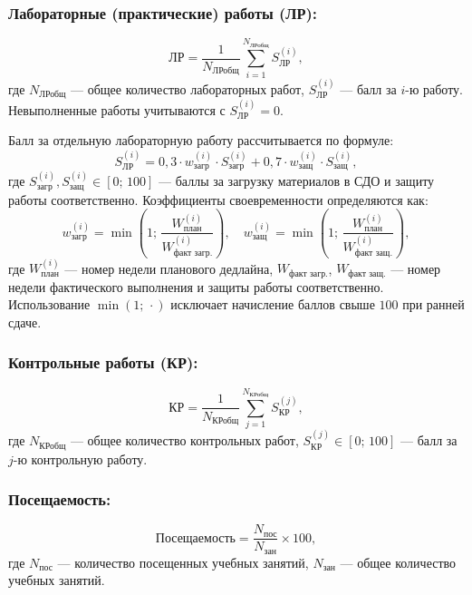 \documentclass[10pt,a4paper]{article}
\begin{document}
    \subsubsection{Лабораторные (практические) работы (ЛР):}
    \begin{equation}
        \text{ЛР} = \frac{1}{N_{\text{ЛРобщ}}} \sum_{i=1}^{N_{\text{ЛРобщ}}} S_{\text{ЛР}}^{(i)},
    \end{equation}
    где $N_{\text{ЛРобщ}}$ --- общее количество лабораторных работ, $S_{\text{ЛР}}^{(i)}$ --- балл за $i$-ю работу.
    Невыполненные работы учитываются с $S_{\text{ЛР}}^{(i)} = 0$.

    Балл за отдельную лабораторную работу рассчитывается по формуле:
    \begin{equation}
        S_{\text{ЛР}}^{(i)} = 0,3 \cdot w_{\text{загр}}^{(i)} \cdot S_{\text{загр}}^{(i)} + 0,7 \cdot w_{\text{защ}}^{(i)} \cdot S_{\text{защ}}^{(i)},
    \end{equation}
    где $S_{\text{загр}}^{(i)}, S_{\text{защ}}^{(i)} \in [0;\,100]$ --- баллы за загрузку материалов в СДО и защиту работы соответственно.
    Коэффициенты своевременности определяются как:
    \begin{equation}
        w_{\text{загр}}^{(i)} = \min\!\left(1;\, \frac{W_{\text{план}}^{(i)}}{W_{\text{факт загр.}}^{(i)}}\right), \quad
        w_{\text{защ}}^{(i)} = \min\!\left(1;\, \frac{W_{\text{план}}^{(i)}}{W_{\text{факт защ.}}^{(i)}}\right),
    \end{equation}
    где $W_{\text{план}}^{(i)}$ --- номер недели планового дедлайна, $W_{\text{факт загр.}}$, $W_{\text{факт защ.}}$ --- номер недели фактического выполнения и защиты работы соответственно.
    Использование $\min(1;\,\cdot)$ исключает начисление баллов свыше $100$ при ранней сдаче.

    \subsubsection{Контрольные работы (КР):}
    \begin{equation}
        \text{КР} = \frac{1}{N_{\text{КРобщ}}} \sum_{j=1}^{N_{\text{КРобщ}}} S_{\text{КР}}^{(j)},
    \end{equation}
    где $N_{\text{КРобщ}}$ --- общее количество контрольных работ, $S_{\text{КР}}^{(j)} \in [0;\,100]$ --- балл за $j$-ю контрольную работу.

    \subsubsection{Посещаемость:}
    \begin{equation}
        \text{Посещаемость} = \frac{N_{\text{пос}}}{N_{\text{зан}}} \times 100,
    \end{equation}
    где $N_{\text{пос}}$ --- количество посещенных учебных занятий, $N_{\text{зан}}$ --- общее количество учебных занятий.
\end{document}
